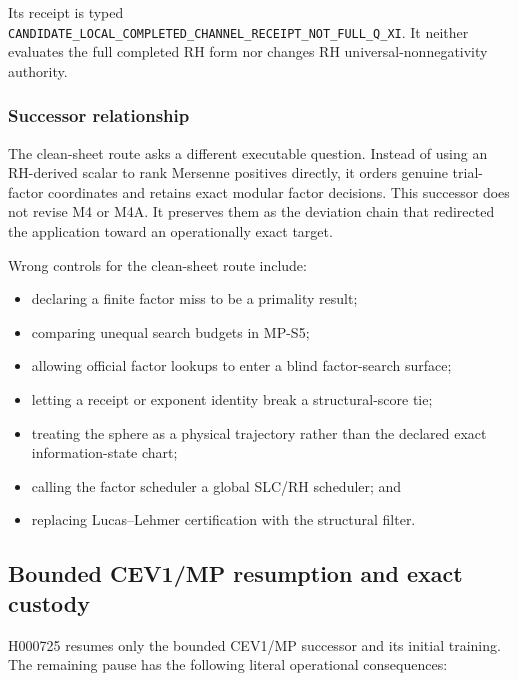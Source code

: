 Its receipt is typed
\nolinkurl{CANDIDATE_LOCAL_COMPLETED_CHANNEL_RECEIPT_NOT_FULL_Q_XI}.
It neither evaluates the full completed RH form nor changes RH
universal-nonnegativity authority.

\subsubsection{Successor relationship}\label{viii-ch10-successor-relationship}

The clean-sheet route asks a different executable question. Instead of
using an RH-derived scalar to rank Mersenne positives directly, it
orders genuine trial-factor coordinates and retains exact modular factor
decisions. This successor does not revise M4 or M4A. It preserves them
as the deviation chain that redirected the application toward an
operationally exact target.

Wrong controls for the clean-sheet route include:

\begin{itemize}
\tightlist
\item
  declaring a finite factor miss to be a primality result;
\item
  comparing unequal search budgets in MP-S5;
\item
  allowing official factor lookups to enter a blind factor-search
  surface;
\item
  letting a receipt or exponent identity break a structural-score tie;
\item
  treating the sphere as a physical trajectory rather than the declared
  exact information-state chart;
\item
  calling the factor scheduler a global SLC/RH scheduler; and
\item
  replacing Lucas--Lehmer certification with the structural filter.
\end{itemize}

\subsection{Bounded CEV1/MP resumption and exact
custody}\label{viii-ch10-bounded-cev1mp-resumption-and-exact-custody}

H000725 resumes only the bounded CEV1/MP successor and its initial
training. The remaining pause has the following literal operational
consequences:

